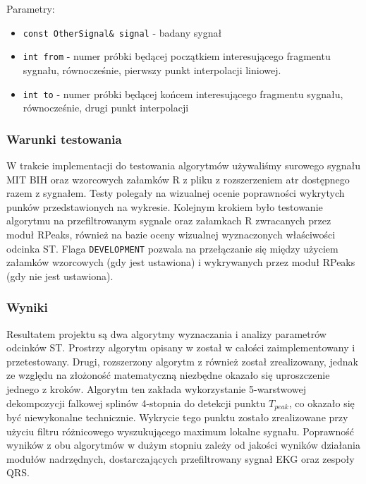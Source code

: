 \documentclass[a4paper, 11pt]{article}
\begin{document}
Parametry:
\begin{itemize}
  \item \verb|const OtherSignal& signal| - badany sygnał
  \item \verb|int from| - numer próbki będącej początkiem interesującego
    fragmentu sygnału, równocześnie, pierwszy punkt interpolacji liniowej.
  \item \verb|int to| - numer próbki będącej końcem interesującego fragmentu
    sygnału, równocześnie, drugi punkt interpolacji
\end{itemize}

\subsubsection{Warunki testowania}
\label{sec:st_interval:tests}
W trakcie implementacji do testowania algorytmów używaliśmy surowego sygnału MIT BIH oraz wzorcowych załamków R z pliku z rozszerzeniem atr dostępnego razem z sygnałem. Testy polegały na wizualnej ocenie poprawności wykrytych punków przedstawionych na wykresie. Kolejnym krokiem było testowanie algorytmu na przefiltrowanym sygnale oraz załamkach R zwracanych przez moduł RPeaks, również na bazie oceny wizualnej wyznaczonych właściwości odcinka ST. Flaga \verb|DEVELOPMENT| pozwala na przełączanie się między użyciem załamków wzorcowych (gdy jest ustawiona) i wykrywanych przez moduł RPeaks (gdy nie jest ustawiona).

\subsubsection{Wyniki}
\label{sec:st_interval:results}
Resultatem projektu są dwa algorytmy wyznaczania i analizy parametrów odcinków ST. Prostrzy algorytm opisany w \cite{AUGUST1} został w całości zaimplementowany i przetestowany. Drugi, rozszerzony algorytm z \cite{SHEN1} również został zrealizowany, jednak ze względu na złożoność matematyczną niezbędne okazało się uproszczenie jednego z kroków. Algorytm ten zakłada wykorzystanie 5-warstwowej dekompozycji falkowej splinów 4-stopnia do detekcji punktu $T_{peak}$, co okazało się być niewykonalne technicznie. Wykrycie tego punktu zostało zrealizowane przy użyciu filtru różnicowego wyszukującego maximum lokalne sygnału. Poprawność wyników z obu algorytmów w dużym stopniu zależy od jakości wyników działania modułów nadrzędnych, dostarczających przefiltrowany sygnał EKG oraz zespoły QRS.
\end{document}

